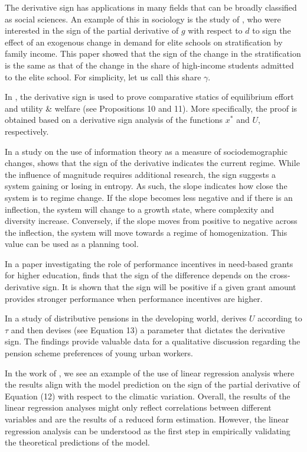 \documentclass[11pt]{book}
\begin{document}
The derivative sign has applications in many fields that can be broadly classified as social sciences. An example of this in sociology is the study of \cite{estrada2017effect}, who were interested in the sign of the partial derivative of
$g$ with respect to $d$ to sign the effect of an exogenous change
in demand for elite schools on stratification by family income. This paper showed that the sign of the change in the stratification is the same as that of the change in the share of high-income students
admitted to the elite school. For simplicity, let us call this share $\gamma$.

In \cite{ushchev2017technology}, the derivative sign is used to prove comparative
statics of equilibrium effort and utility \& welfare (see Propositions 10 and 11). More specifically, the proof is obtained based on a derivative sign analysis of the functions $x^{*}$ and $U$, respectively.

In a study on the use of information theory as a measure of sociodemographic changes, \cite{lancaster2018information} shows that the sign of the derivative indicates the current regime. While the influence of magnitude requires additional research, the
sign suggests a system gaining or losing in entropy. As such, the slope indicates how close the system is to regime change. If the slope becomes
less negative and if there is an inflection, the system will change to a growth
state, where complexity and diversity increase. Conversely, if the
slope moves from positive to negative across the inflection, the system
will move towards a regime of homogenization. This value can be used as a planning tool.

In a paper investigating the role of performance incentives in need-based grants for higher
education, \cite{montalban2018role} finds that the sign of the difference depends on
the cross-derivative sign. It is shown that the sign will be positive if
a given grant amount provides stronger performance when performance
incentives are higher.

In a study of distributive pensions in the developing world, \cite{kemmerling2019redistributive} derives $U$ according to $\tau$ and then devises (see Equation 13) a parameter that dictates the derivative
sign. The findings provide valuable data for a qualitative discussion regarding the
pension scheme preferences of young urban workers.

In the work of \cite{deuster2019climate}, we see an example of the use of linear regression analysis where the results align
with the model prediction on the sign of the partial derivative of
Equation (12) with respect to the climatic variation. Overall, the results of the linear regression analyses might only reflect correlations between different variables and are the results of a reduced form estimation. However, the linear regression analysis can be understood as the first step
in empirically validating the theoretical predictions of the model.
\end{document}
